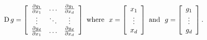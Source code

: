 \begin{enumerate}
                \[
                    \operatorname{D} g = 
                        \left[
                            \begin{array}{ccc}
                                \frac{\partial g_1}{\partial x_1} & \dots  & \frac{\partial g_1}{\partial x_d} \\
                                \vdots                            & \ddots & \vdots                            \\
                                \frac{\partial g_d}{\partial x_1} & \dots  & \frac{\partial g_d}{\partial x_d} \\
                            \end{array}
                        \right] 
                    \text{  where  }~
                    x = 
                        \left[
                            \begin{array}{c}
                                x_1 \\
                                \vdots \\
                                x_d
                            \end{array}
                        \right]
                    \text{  and  }~
                    g = 
                        \left[
                            \begin{array}{c}
                                g_1 \\
                                \vdots \\
                                g_d
                            \end{array}
                        \right].
                \]
    \end{enumerate}

